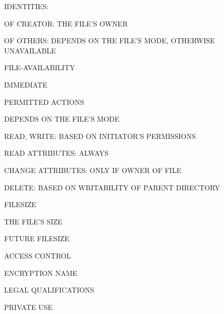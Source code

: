 \begin{bwslide}

\begin{nrtc}
\item	IDENTITIES:
    \begin{nrtc}
    \item	OF CREATOR: THE FILE'S OWNER

    \item	OF OTHERS: DEPENDS ON THE FILE'S MODE, OTHERWISE UNAVAILABLE
    \end{nrtc}

\item	FILE-AVAILABILITY
    \begin{nrtc}
    \item	IMMEDIATE
    \end{nrtc}

\item	PERMITTED ACTIONS
    \begin{nrtc}
    \item	DEPENDS ON THE FILE'S MODE

    \item	READ, WRITE: BASED ON INITIATOR'S PERMISSIONS

    \item	READ ATTRIBUTES: ALWAYS

    \item	CHANGE ATTRIBUTES: ONLY IF OWNER OF FILE

    \item	DELETE: BASED ON WRITABILITY OF PARENT DIRECTORY
    \end{nrtc}

\item	FILESIZE
    \begin{nrtc}
    \item	THE FILE'S SIZE
    \end{nrtc}
\end{nrtc}
\end{bwslide}


\begin{bwslide}

\begin{nrtc}
\item	FUTURE FILESIZE

\item	ACCESS CONTROL

\item	ENCRYPTION NAME

\item	LEGAL QUALIFICATIONS

\item	PRIVATE USE
\end{nrtc}
\end{bwslide}


